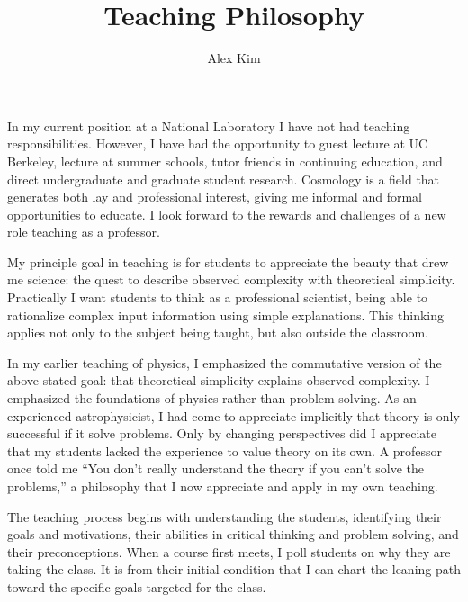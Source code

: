 \documentclass{article}
\date{}
\begin{document}
\title{Teaching Philosophy}
\author{Alex Kim}
\maketitle

In my current position at a National Laboratory I have not had teaching responsibilities.  However,
I have had the opportunity to guest lecture at UC Berkeley, lecture at summer schools, tutor friends
in continuing education, and direct undergraduate and graduate student research.  Cosmology
is a field that generates both lay and professional interest, giving me informal and formal opportunities to
educate.  I look forward to the rewards and challenges of a new role teaching as a professor. 

My principle goal in teaching is for students to appreciate the beauty that drew me science: the quest to
describe  observed complexity with
theoretical simplicity.  Practically I want students to think as a professional scientist, being able to 
rationalize complex input information using simple explanations.
This thinking applies not only to the subject being taught,  but also
outside the classroom.

In my earlier teaching of physics,  I emphasized the commutative version
of the above-stated goal: that theoretical simplicity explains observed complexity.  I  emphasized the foundations of physics
rather than problem solving. As an experienced astrophysicist, I had come to
appreciate implicitly that theory is only successful if it solve problems.  Only by changing perspectives
did I appreciate that my students lacked the experience
to value theory on its own.  A  professor once told me
``You don't really understand the theory if you can't solve the problems,'' a philosophy that I now  appreciate and
apply in my own teaching.


The teaching process  begins with understanding the students, identifying their goals and motivations, their abilities in critical thinking and
problem solving, and their preconceptions.  When a course first meets, I poll students on why they are taking the
class.  It is from their initial condition that I can chart the leaning path toward the specific goals targeted
for the class. 
\end{document}
